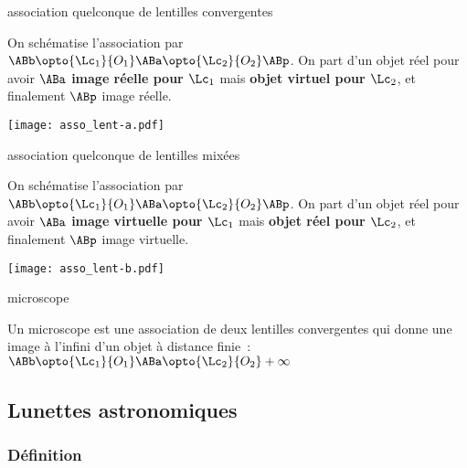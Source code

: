 \documentclass[../main/main.tex]{subfiles}
\begin{document}
\begin{exem}[label=exem:asso_lent]{association quelconque de lentilles
    convergentes}

    On schématise l'association par $\ABb \opto{\Lc_1}{O_1} \ABa
    \opto{\Lc_2}{O_2} \ABp$. On part d'un objet réel pour avoir $\ABa$
    \textbf{image réelle pour $\Lc_1$} mais \textbf{objet virtuel pour $\Lc_2$},
    et finalement $\ABp$ image réelle.

    \tcblower
    \begin{center}
        \texttt{[image: asso\_lent-a.pdf]}
        \label{fig:asso_lent-conv}
    \end{center}
\end{exem}
\begin{exem}[label=exem:asso_lent]{association quelconque de lentilles
    mixées}

    On schématise l'association par $\ABb \opto{\Lc_1}{O_1} \ABa
    \opto{\Lc_2}{O_2} \ABp$. On part d'un objet réel pour avoir $\ABa$
    \textbf{image virtuelle pour $\Lc_1$} mais \textbf{objet réel pour $\Lc_2$},
    et finalement $\ABp$ image virtuelle.

    \tcblower
    \begin{center}
        \texttt{[image: asso\_lent-b.pdf]}
        \label{fig:asso_lent-mix}
    \end{center}
\end{exem}

\begin{ror}[label=ror:microscope, hand]{microscope}

    Un microscope est une association de deux lentilles convergentes qui donne
    une image à l'infini d'un objet à distance finie~: $\ABb \opto{\Lc_1}{O_1}
    \ABa \opto{\Lc_2}{O_2} +\infty$
\end{ror}

\subsection{Lunettes astronomiques}
\subsubsection{Définition}
\end{document}
